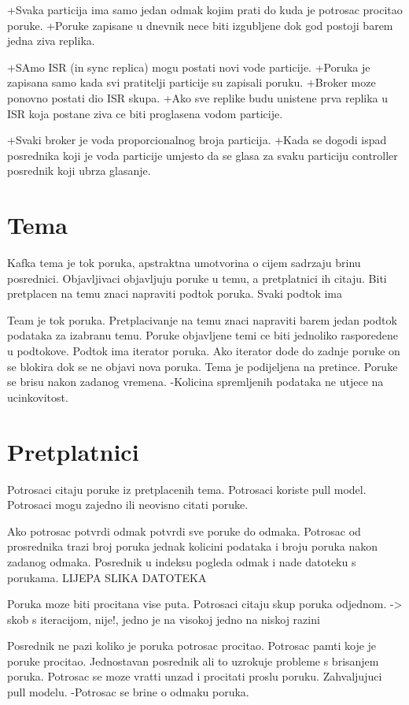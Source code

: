 \documentclass[times, utf8, diplomski, numeric]{fer}
\begin{document}
+Svaka particija ima samo jedan odmak kojim prati do kuda je potrosac procitao poruke. 
+Poruke zapisane u dnevnik nece biti izgubljene dok god postoji barem jedna ziva replika.

+SAmo ISR (in sync replica) mogu postati novi vode particije.
+Poruka je zapisana samo kada svi pratitelji particije su zapisali poruku.
+Broker moze ponovno postati dio ISR skupa.
+Ako sve replike budu unistene prva replika u ISR koja postane ziva ce biti proglasena vodom particije.


+Svaki broker je voda proporcionalnog broja particija.
+Kada se dogodi ispad posrednika koji je voda particije umjesto da se glasa za svaku particiju controller posrednik koji ubrza glasanje.


\chapter{Tema}
Kafka tema je tok poruka, apstraktna umotvorina o cijem sadrzaju brinu posrednici. Objavljivaci objavljuju poruke u temu, a pretplatnici ih citaju. Biti pretplacen na temu znaci napraviti podtok poruka. Svaki podtok ima 

Team je tok poruka.
Pretplacivanje na temu znaci napraviti barem jedan podtok podataka za izabranu temu.
Poruke objavljene temi ce biti jednoliko rasporedene u podtokove.
Podtok ima iterator poruka.
Ako iterator dode do zadnje poruke on se blokira dok se ne objavi nova poruka.
Tema je podijeljena na pretince.
Poruke se brisu nakon zadanog vremena.
-Kolicina spremljenih podataka ne utjece na ucinkovitost.



\chapter{Pretplatnici}
Potrosaci citaju poruke iz pretplacenih tema.
Potrosaci koriste pull model.
Potrosaci mogu zajedno ili neovisno citati poruke.

Ako potrosac potvrdi odmak potvrdi sve poruke do odmaka.
Potrosac od prosrednika trazi broj poruka jednak kolicini podataka i broju poruka nakon zadanog odmaka.
Posrednik u indeksu pogleda odmak i nade datoteku s porukama.
LIJEPA SLIKA DATOTEKA

Poruka moze biti procitana vise puta.
Potrosaci citaju skup poruka odjednom. -> skob s iteracijom, nije!, jedno je na visokoj jedno na niskoj razini

Posrednik ne pazi koliko je poruka potrosac procitao.
Potrosac pamti koje je poruke procitao.
Jednostavan posrednik ali to uzrokuje probleme s brisanjem poruka.
Potrosac se moze vratti unzad i procitati proslu poruku. Zahvaljujuci pull modelu.
-Potrosac se brine o odmaku poruka.
\end{document}
